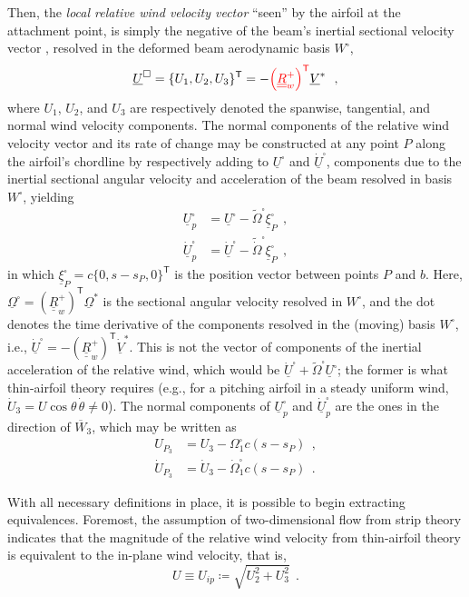 \documentclass[12pt,a4paper,oneside,english]{abntex2} %
\newcommand{\fix}[1]{{\color{red}#1}}
\newcommand{\vect}[1]{\underline{#1}}
\newcommand{\uvec}[1]{\overline{#1}}
\def\tens#1{\underline{\underline{#1}}}
\def\til#1{\widetilde{#1}}
\def\lp{\left(}
\def\rp{\right)}
\def\T{\mathsf{T}}
\def\Ws{W^{\square}}
\def\R{\tens{R}}
\def\Rw{\R_w}
\def\V{\vect{V}}
\def\Vs{\V^{*}}
\def\Vsdot{\dot{\V}^{*}}
\def\Om{\vect{\Omega}}
\def\Oms{\Om^{*}}
\def\Omtil{\til{\Omega}}
\def\Omtilsq{\Omtil^{\square}}
\def\Omtilsqdot{\til{\dot{\Omega}}^{\square}}
\def\U{\vect{U}}
\def\Us{\U^\square}
\def\Usdot{\dot{\U}^\square}
\def\Usp{\Us_p}
\def\Uspdot{\Usdot_p}
\def\Uip{U_{ip}}
\def\thetadot{\dot{\theta}}
\begin{document}
Then, the \textit{local relative wind velocity vector} ``seen'' by the airfoil at the attachment point, is simply the negative of the beam's inertial sectional velocity vector \cite{drela2014flight}, resolved in the deformed beam aerodynamic basis $\Ws$,
\begin{align}
    \Us = \{U_1,U_2,U_3\}^\T = -\fix{\lp\Rw^+\rp^\T}\Vs \ \ ,
    \label{eq:Us} 
\end{align}
where $U_1$, $U_2$, and $U_3$ are respectively denoted the spanwise, tangential, and normal wind velocity components. The normal components of the relative wind velocity \fix{vector and its rate of change} may be constructed at any point $P$ along the airfoil's chordline by respectively adding to $\Us$ and $\Usdot$, components due to the inertial sectional angular velocity and acceleration of the beam resolved in basis $\Ws$, yielding
\begin{align}
    \Usp &= \Us - \Omtilsq\vect{\xi}_P^{\square}
    \ \ , \label{eq:Usp}
    \\
    \Uspdot &= \Usdot - \Omtilsqdot\vect{\xi}_P^{\square} \ \ ,
    \label{eq:Uspdot}
\end{align}
in which $\vect{\xi}_P^{\square} = c\{0,s-s_P,0\}^\T$ is the position vector between points $P$ and $b$. \fix{Here, $\vect{\Omega}^\square=(\Rw^+)^\T\Oms$ is the sectional angular velocity resolved in $\Ws$, and the dot denotes the time derivative of the components resolved in the (moving) basis $\Ws$, i.e., $\Usdot=-(\Rw^+)^\T\Vsdot$. This is not the vector of components of the inertial acceleration of the relative wind, which would be $\Usdot+\Omtilsq\Us$; the former is what thin-airfoil theory requires (e.g., for a pitching airfoil in a steady uniform wind, $\dot U_3=U\cos\theta\,\thetadot\neq0$).} The normal components of $\Usp$ and $\Uspdot$ are the ones in the direction of $\uvec{W}_3$, which may be written as
\begin{align}
    U_{P_3} &= U_{3} - \Omega_1^{\square} c \lp s-s_P \rp \ \ ,
    \label{eq:Usp3}
    \\
    \dot{U}_{P_3} &= \dot{U}_{3} - \dot{\Omega}_1^{\square} c \lp s-s_P \rp \ \ .
    \label{eq:Uspdot3}
\end{align}

With all necessary definitions in place, it is possible to begin extracting equivalences. Foremost, the assumption of two-dimensional flow from strip theory indicates that the magnitude of the relative wind velocity from thin-airfoil theory is equivalent to the in-plane wind velocity, that is,
\begin{equation}
    U \equiv \Uip \coloneqq \sqrt{U_2^2+U_3^2} \ \ .
    \label{eq:U_equiv}
\end{equation}
\end{document}
